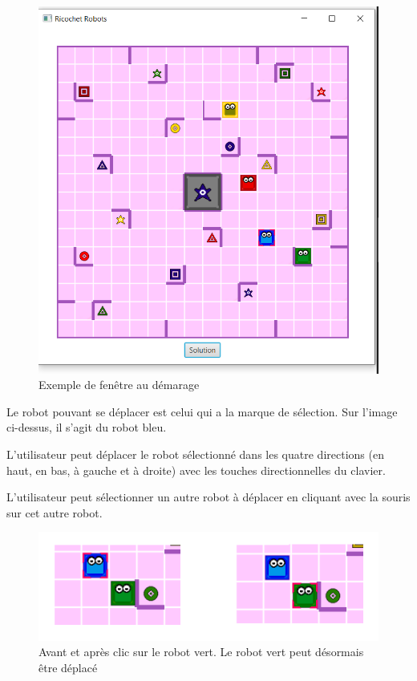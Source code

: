 \documentclass[a4paper, 12pt]{article}
\begin{document}
        \begin{figure}[H]
            \centering
            \includegraphics[scale=0.5]{images/fenetre.PNG}
            \caption{Exemple de fenêtre au démarage}
        \end{figure}
        
        
        Le robot pouvant se déplacer est celui qui a la marque de sélection. Sur l'image ci-dessus, il s'agit du robot bleu.
        
        L'utilisateur peut déplacer le robot sélectionné dans les quatre directions (en haut, en bas, à gauche et à droite) avec les touches directionnelles du clavier.
        
        
        L'utilisateur peut sélectionner un autre robot à déplacer en cliquant avec la souris sur cet autre robot. 
        
        \begin{figure}[H]
            \centering
            \includegraphics[]{images/selectionRobot.PNG}
            \caption{Avant et après clic sur le robot vert. Le robot vert peut désormais être déplacé}
        \end{figure}
        
\end{document}
